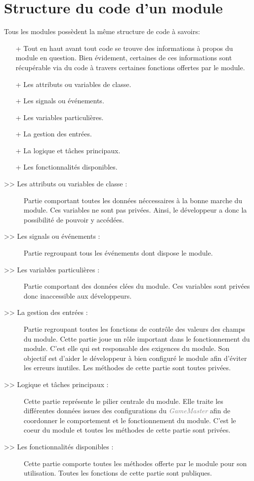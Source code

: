 \documentclass[a4paper, 11pt]{article}
\begin{document}
	\section{Structure du code d'un module}
	Tous les modules possèdent la même structure de code à savoirs:
	\begin{itemize}
		\item[+] Tout en haut avant tout code se trouve des informations à propos du module en question. 
		Bien évidement, certaines de ces informations sont récupérable via du code à travers certaines 
		fonctions offertes par le module.
		\item[+] Les attributs ou variables de classe.
		\item[+] Les signals ou événements.
		\item[+] Les variables particulières.
		\item[+] La gestion des entrées.
		\item[+] La logique et tâches principaux.
		\item[+] Les fonctionnalités disponibles.
	\end{itemize}
	\begin{description}
		\item[>> Les attributs ou variables de classe :] Partie comportant toutes les données néccessaires à 
		la bonne marche du module. Ces variables ne sont pas privées. Ainsi, le développeur a donc la 
		possibilité de pouvoir y accédées.\\
		\item[>> Les signals ou événements :] Partie regroupant tous les événements dont dispose le module.
		\\
		\item[>> Les variables particulières :] Partie comportant des données clées du module. Ces variables
		sont privées donc inaccessible aux développeurs.\\
		\item[>> La gestion des entrées :] Partie regroupant toutes les fonctions de contrôle des valeurs
		des champs du module. Cette partie joue un rôle important dans le fonctionnement du module. C'est
		elle qui est responsable des exigences du module. Son objectif est d'aider le développeur à bien
		configuré le module afin d'éviter les erreurs inutiles. Les méthodes de cette partie sont toutes
		privées.\\
		\item[>> Logique et tâches principaux :] Cette partie représente le pilier centrale du module. Elle
		traite les différentes données issues des configurations du \textit{\textcolor{gray}{GameMaster}} 
		afin de coordonner le comportement et le fonctionnement du module. C'est le coeur du module et
		toutes les méthodes de cette partie sont privées.\\
		\item[>> Les fonctionnalités disponibles :] Cette partie comporte toutes les méthodes offerte par le
		module pour son utilisation. Toutes les fonctions de cette partie sont publiques.
	\end{description}
\end{document}
